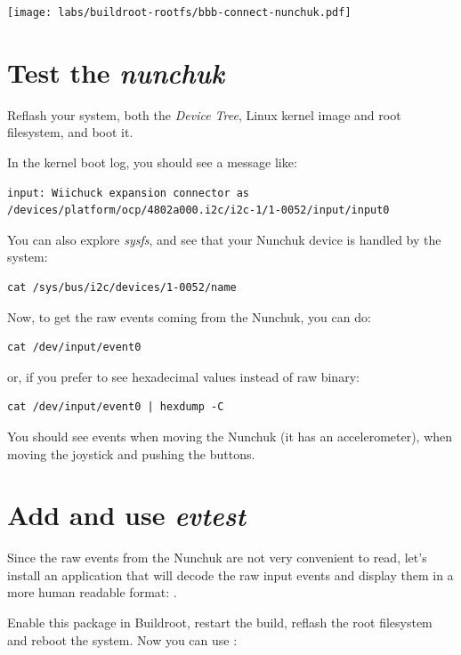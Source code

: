 \begin{center}
\texttt{[image: labs/buildroot-rootfs/bbb-connect-nunchuk.pdf]}
\end{center}

\section{Test the {\em nunchuk}}

Reflash your system, both the {\em Device Tree}, Linux kernel image
and root filesystem, and boot it.

In the kernel boot log, you should see a message like:

\begin{verbatim}
input: Wiichuck expansion connector as /devices/platform/ocp/4802a000.i2c/i2c-1/1-0052/input/input0
\end{verbatim}

You can also explore {\em sysfs}, and see that your Nunchuk device is
handled by the system:

\begin{verbatim}
cat /sys/bus/i2c/devices/1-0052/name
\end{verbatim}

Now, to get the raw events coming from the Nunchuk, you can do:

\begin{verbatim}
cat /dev/input/event0
\end{verbatim}

or, if you prefer to see hexadecimal values instead of raw binary:

\begin{verbatim}
cat /dev/input/event0 | hexdump -C
\end{verbatim}

You should see events when moving the Nunchuk (it has an
accelerometer), when moving the joystick and pushing the buttons.

\section{Add and use {\em evtest}}

Since the raw events from the Nunchuk are not very convenient to read,
let's install an application that will decode the raw input events
and display them in a more human readable format: .

Enable this package in Buildroot, restart the build, reflash the root
filesystem and reboot the system. Now you can use :

